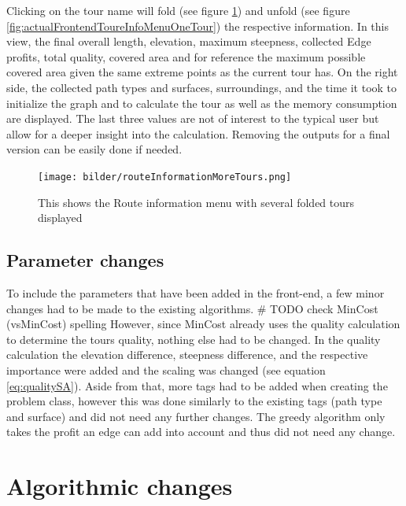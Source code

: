 Clicking on the tour name will fold (see figure \ref{fig:actualFrontendToureInfoMenuMoreTours}) and unfold (see figure \ref{fig:actualFrontendToureInfoMenuOneTour}) the respective information.
In this view, the final overall length, elevation, maximum steepness, collected Edge profits, total quality, covered area and for reference the maximum possible covered area given the same extreme points as the current tour has.
On the right side, the collected path types and surfaces, surroundings, and the time it took to initialize the graph and to calculate the tour as well as the memory consumption are displayed.
The last three values are not of interest to the typical user but allow for a deeper insight into the calculation. 
Removing the outputs for a final version can be easily done if needed. 



\begin{figure}[H]
	\centering
	\texttt{[image: bilder/routeInformationMoreTours.png]}
	\caption{This shows the Route information menu with several folded tours displayed}
	\label{fig:actualFrontendToureInfoMenuMoreTours}
\end{figure}




\subsection{Parameter changes}
\label{subsec:parameterChanges}

To include the parameters that have been added in the front-end, a few minor changes had to be made to the existing algorithms. \# TODO check MinCost (vsMinCost) spelling
However, since MinCost already uses the quality calculation to determine the tours quality, nothing else had to be changed.
In the quality calculation the elevation difference, steepness difference, and the respective importance were added and the scaling was changed (see equation \ref{eq:qualitySA}).
Aside from that, more tags had to be added when creating the problem class, however this was done similarly to the existing tags (path type and surface) and did not need any further changes.
The greedy algorithm only takes the profit an edge can add into account and thus did not need any change.


\section{Algorithmic changes}
\label{sec:algorithmicChanges}

